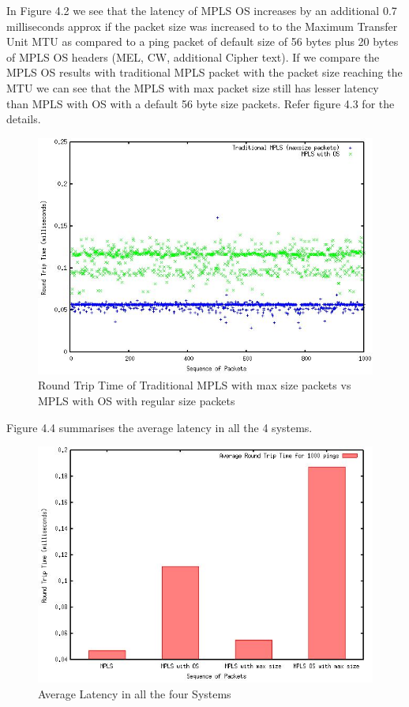     In Figure 4.2 we see that the latency of MPLS OS increases by an additional 0.7 milliseconds approx if the packet size was increased to to the Maximum Transfer Unit MTU as compared to a ping packet of default size of 56 bytes plus 20 bytes of MPLS OS headers (MEL, CW, additional Cipher text).
    If we compare the MPLS OS results with traditional MPLS packet with the packet size reaching the MTU we can see that the MPLS with max packet size still has lesser latency than MPLS with OS with a default 56 byte size packets. Refer figure 4.3 for the details.
    
   \begin{figure}[H]
       \centering\includegraphics[width=\textwidth]{images/24_MaxMPLSvsOS.JPG}
       \caption{Round Trip Time of Traditional MPLS with max size packets vs MPLS with OS with regular size packets}
       \label{fig:compbest}
\end{figure}

Figure 4.4 summarises the average latency in all the 4 systems.

\begin{figure}[H]
       \centering\includegraphics[width=\textwidth]{images/21_Average.JPG}
       \caption{Average Latency in all the four Systems}
       \label{fig:compbest}
\end{figure}
    
